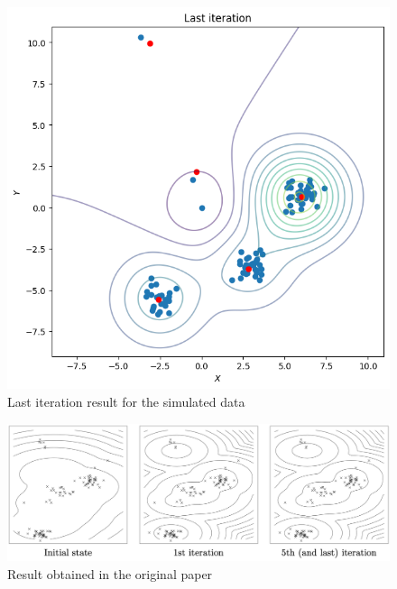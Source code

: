 \documentclass{article}
\begin{document}
\begin{figure}[H]
    \centering
    \includegraphics[scale=0.4]{images/sampled_last_iteration.png}
    \caption{Last iteration result for the simulated data}
    \label{fig:alg_last}
\end{figure}
\begin{figure}[H]
    \centering
    \includegraphics[scale=0.4]{images/paper_result.png}
    \caption{Result obtained in the original paper}
    \label{fig:alg_paper}
\end{figure}
\end{document}
